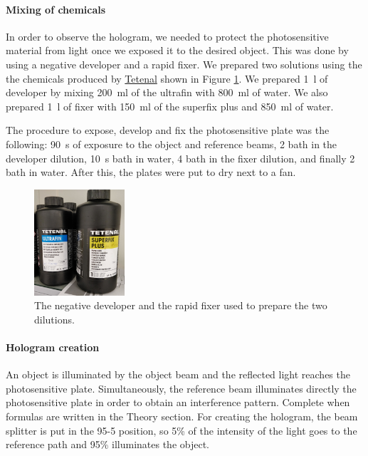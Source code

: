 \documentclass[11pt,a4paper]{article}
\begin{document}
\paragraph{Mixing of chemicals}
In order to observe the hologram, we needed to protect the photosensitive material from light once we exposed it to the desired object. This was done by using a negative developer and a rapid fixer. We prepared two solutions using the the chemicals produced by \href{https://www.tetenal.com/}{Tetenal} shown in Figure \ref{fig:chemicals}. We prepared \SI{1}{\litre} of developer by mixing \SI{200}{\milli\litre} of the ultrafin with \SI{800}{\milli\litre} of water. We also prepared \SI{1}{\litre} of fixer with \SI{150}{\milli\litre} of the superfix plus and \SI{850}{\milli\litre} of water.

The procedure to expose, develop and fix the photosensitive plate was the following: \SI{90}{\second} of exposure to the object and reference beams, \SI{2}{\min} bath in the developer dilution, \SI{10}{\second} bath in water, \SI{4}{\min} bath in the fixer dilution, and finally \SI{2}{\min} bath in water. After this, the plates were put to dry next to a fan.

\begin{figure}[ht]
\centering
\includegraphics[width=0.3\textwidth]{Chemicals}
\caption{The negative developer and the rapid fixer used to prepare the two dilutions.}
\label{fig:chemicals}
\end{figure}

\paragraph{Hologram creation}
An object is illuminated by the object beam and the reflected light reaches the photosensitive plate. Simultaneously, the reference beam illuminates directly the photosensitive plate in order to obtain an interference pattern. {\color{red}Complete when formulas are written in the Theory section.} For creating the hologram, the beam splitter is put in the 95-5 position, so 5\% of the intensity of the light goes to the reference path and 95\% illuminates the object.
\end{document}
